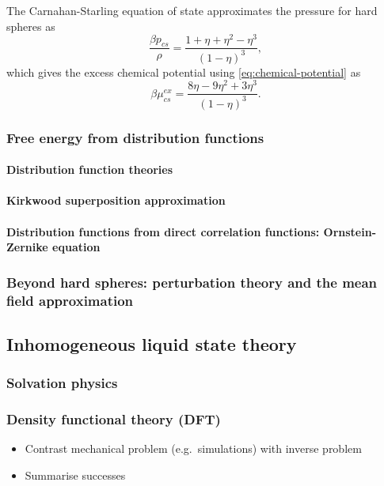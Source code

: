 The Carnahan-Starling equation of state approximates the pressure for hard spheres as \cite{Carnahan1969}
\begin{equation}\label{eq:cs-pressure}
  \frac{\beta p_{cs}}{\rho} = \frac{1 + \eta + \eta^2 - \eta^3}{(1-\eta)^3},
\end{equation}
which gives the excess chemical potential using \eqref{eq:chemical-potential} as
\begin{equation}\label{eq:cs-mu}
  \beta \mu_{cs}^{ex} = \frac{8\eta - 9\eta^2 + 3\eta^3}{(1-\eta)^3}.
\end{equation}

\subsubsection{Free energy from distribution functions}
\paragraph{Distribution function theories}
\paragraph{Kirkwood superposition approximation}
\paragraph{Distribution functions from direct correlation functions: Ornstein-Zernike equation}

\subsubsection{Beyond hard spheres: perturbation theory and the mean field approximation}

\subsection{Inhomogeneous liquid state theory}

\subsubsection{Solvation physics}
\subsubsection{Density functional theory (DFT)}

\begin{itemize}
\item Contrast mechanical problem (e.g.\ simulations) with inverse problem
\item Summarise successes
\end{itemize}

